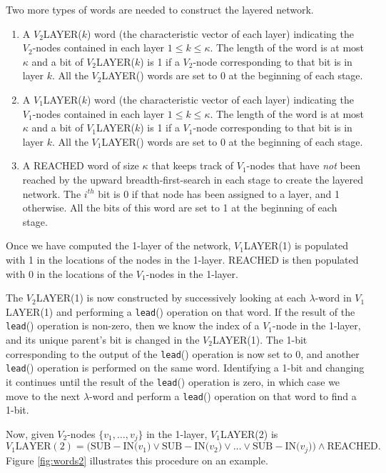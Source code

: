 \documentclass{article}
\begin{document}
Two more types of words are needed to construct the layered network.
\begin{enumerate}
\item A $V_2$LAYER($k$) word (the characteristic vector of each layer) indicating the $V_2$-nodes contained in each layer $1 \leq k \leq \kappa$.  The length of the word is at most $\kappa$ and a bit of $V_2$LAYER($k$) is 1 if a $V_2$-node corresponding to that bit is in layer $k$. All the $V_2$LAYER() words are set to 0 at the beginning of each stage.
\item A $V_1$LAYER($k$) word (the characteristic vector of each layer) indicating the $V_1$-nodes contained in each layer $1 \leq k \leq \kappa$. The length of the word is at most $\kappa$ and a bit of $V_1$LAYER($k$) is 1 if a $V_1$-node corresponding to that bit is in layer $k$. All the $V_1$LAYER() words are set to 0 at the beginning of each stage.
\item A REACHED word of size $\kappa$ that keeps track of $V_1$-nodes that have {\em not} been reached by the upward breadth-first-search in each stage to create the layered network. The $i^{th}$ bit is 0 if that node has been assigned to a layer, and 1 otherwise. All the bits of this word are set to 1 at the beginning of each stage.
\end{enumerate}

Once we have computed the 1-layer of the network, $V_1$LAYER(1) is populated with 1 in the locations of the nodes in the 1-layer. REACHED is then populated with 0 in the locations of the $V_1$-nodes in the 1-layer.

The $V_2$LAYER(1) is now constructed by successively looking at each $\lambda$-word in $V_1$LAYER(1) and performing a {\tt lead}() operation on that word. If the result of the {\tt lead}() operation is non-zero, then we know the index of a $V_1$-node in the 1-layer, and its unique parent's bit is changed in the $V_2$LAYER(1). The 1-bit corresponding to the output of the {\tt lead}() operation is now set to 0, and another {\tt lead}() operation is performed on the same word.  Identifying a 1-bit and changing it continues until the result of the {\tt lead}() operation is zero, in which case we move to the next $\lambda$-word and perform a {\tt lead}() operation on that word to find a 1-bit.

Now, given $V_2$-nodes $\{v_1, \ldots, v_j\}$ in the 1-layer, $V_1$LAYER(2) is
\[
V_1\mathrm{LAYER(2)} = \mathrm{(SUB-IN(}v_1\mathrm{)} \vee \mathrm{SUB-IN(}v_2\mathrm{)} \vee \ldots \vee
\mathrm{SUB-IN(}v_j\mathrm{))}\wedge \mathrm{REACHED}.
\]
Figure \ref{fig:words2} illustrates this procedure on an example.
\end{document}
